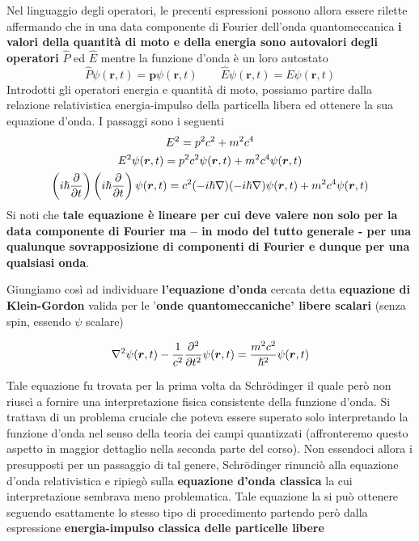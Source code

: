 Nel linguaggio degli operatori, le precenti espressioni possono allora
essere rilette affermando che in una data componente di Fourier
dell'onda quantomeccanica \textbf{i valori della quantità di moto e
della energia sono autovalori degli operatori} \(\hat{P}\) ed
\(\hat{E}\) mentre la funzione d'onda è un loro autostato
\[
	\hat{P}\psi(\bm{r},t) = \bm{p}\psi(\bm{r},t) \qquad
	\hat{E}\psi(\bm{r},t) = E\psi(\bm{r},t)
\]
Introdotti gli operatori energia e quantità di moto, possiamo
partire dalla relazione relativistica energia-impulso della particella
libera ed ottenere la sua equazione d'onda.
I passaggi sono i seguenti
\begin{gather*}
	E^2 = p^2c^2 + m^2c^4\\
	E^2\psi(\bm{r},t) = p^2c^2\psi(\bm{r},t)+m^2c^4\psi(\bm{r},t)\\
	\left( i \hslash \frac{\partial}{\partial t}\right)\left( i \hslash \frac{\partial}{\partial t}\right)\psi(\bm{r},t) = c^2 (-i \hslash \nabla)(-i \hslash \nabla)\psi(\bm{r},t)+m^2c^4 \psi(\bm{r},t)\\
\end{gather*}
Si noti che \textbf{tale equazione è lineare per cui deve valere non
solo per la data componente di Fourier ma -- in modo del tutto generale
- per una qualunque sovrapposizione di componenti di Fourier e dunque
per una qualsiasi onda}.

Giungiamo così ad individuare \textbf{l'equazione d'onda} cercata detta
\textbf{equazione di Klein-Gordon} valida per le '\textbf{onde
quantomeccaniche' libere scalari} (senza spin, essendo \(\psi\) scalare)

\begin{equation}
	\nabla^2 \psi(\bm{r},t) - \frac{1}{c^2}\frac{\partial^2}{\partial t^2}\psi(\bm{r},t) =
	\frac{m^2c^2}{\hslash^2}\psi(\bm{r},t)
\end{equation}

Tale equazione fu trovata per la prima volta da Schrödinger il quale
però non riuscì a fornire una interpretazione fisica consistente della
funzione d'onda.
Si trattava di un problema cruciale che poteva essere
superato solo interpretando la funzione d'onda nel senso della teoria
dei campi quantizzati (affronteremo questo aspetto in maggior dettaglio
nella seconda parte del corso).
Non essendoci allora i presupposti per
un passaggio di tal genere, Schrödinger rinunciò alla equazione d'onda
relativistica e ripiegò sulla \textbf{equazione d'onda classica} la cui
interpretazione sembrava meno problematica.
Tale equazione la si può
ottenere seguendo esattamente lo stesso tipo di procedimento partendo
però dalla espressione \textbf{energia-impulso classica delle particelle libere}

